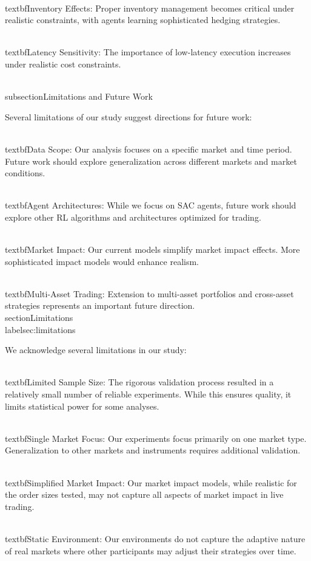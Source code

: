 \documentclass[11pt,a4paper]{article}
\begin{document}
\\textbf{Inventory Effects}: Proper inventory management becomes critical under realistic constraints, with agents learning sophisticated hedging strategies.

\\textbf{Latency Sensitivity}: The importance of low-latency execution increases under realistic cost constraints.

\\subsection{Limitations and Future Work}

Several limitations of our study suggest directions for future work:

\\textbf{Data Scope}: Our analysis focuses on a specific market and time period. Future work should explore generalization across different markets and market conditions.

\\textbf{Agent Architectures}: While we focus on SAC agents, future work should explore other RL algorithms and architectures optimized for trading.

\\textbf{Market Impact}: Our current models simplify market impact effects. More sophisticated impact models would enhance realism.

\\textbf{Multi-Asset Trading}: Extension to multi-asset portfolios and cross-asset strategies represents an important future direction.
\n\n
\\section{Limitations}
\\label{sec:limitations}

We acknowledge several limitations in our study:

\\textbf{Limited Sample Size}: The rigorous validation process resulted in a relatively small number of reliable experiments. While this ensures quality, it limits statistical power for some analyses.

\\textbf{Single Market Focus}: Our experiments focus primarily on one market type. Generalization to other markets and instruments requires additional validation.

\\textbf{Simplified Market Impact}: Our market impact models, while realistic for the order sizes tested, may not capture all aspects of market impact in live trading.

\\textbf{Static Environment}: Our environments do not capture the adaptive nature of real markets where other participants may adjust their strategies over time.
\end{document}
